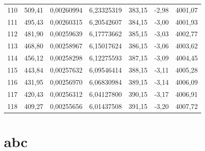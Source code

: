 \documentclass[12pt,a4paper,final,twoside,fleqn]{article}
\begin{document}
\begin{ThreePartTable}
\begin{longtable}{rrrrrrr}
110          & 509,41    & 0,00260994    & 6,23325319  & 383,15     & -2,98      & 4001,07 \\
111          & 495,43    & 0,00260315    & 6,20542607  & 384,15     & -3,00      & 4001,93 \\
112          & 481,90    & 0,00259639    & 6,17773662  & 385,15     & -3,03      & 4002,77 \\
113          & 468,80    & 0,00258967    & 6,15017624  & 386,15     & -3,06      & 4003,62 \\
114          & 456,12    & 0,00258298    & 6,12275593  & 387,15     & -3,09      & 4004,45 \\
115          & 443,84    & 0,00257632    & 6,09546414  & 388,15     & -3,11      & 4005,28 \\
116          & 431,95    & 0,00256970    & 6,06830984  & 389,15     & -3,14      & 4006,09 \\
117          & 420,43    & 0,00256312    & 6,04127800  & 390,15     & -3,17      & 4006,91 \\
118          & 409,27    & 0,00255656    & 6,01437508  & 391,15     & -3,20      & 4007,72 \\
\end{longtable}
\end{ThreePartTable}


\clearpage
\section{abc}
\label{app:ntc_shh_kelvin}


\label{app:ntc_shh_straightline_beta}


\label{app:ntc_shh_straightline}



\newpage
{}
\printbibliography{}
\end{document}
